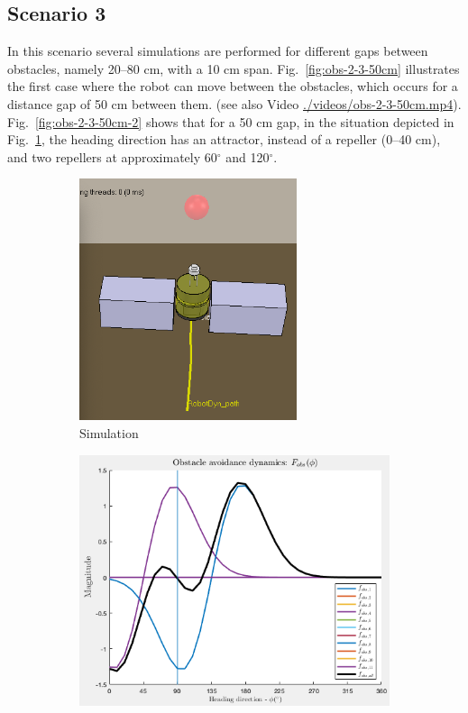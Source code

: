 \subsection{Scenario 3}%
\label{sec:scenario-3-obs}
In this scenario several simulations are performed for different gaps between
obstacles, namely 20--80 cm, with a 10 cm span. Fig.~\ref{fig:obs-2-3-50cm}
illustrates the first case where the robot can move between the obstacles, which
occurs for a distance gap of 50 cm between them.
(see also Video
\href{run:./videos/obs-2-3-50cm.mp4}{./videos/obs-2-3-50cm.mp4}). Fig.~\ref{fig:obs-2-3-50cm-2}
shows that for a 50 cm gap, in the situation depicted in Fig.~\ref{fig:obs-2-3-50cm-1}, the heading direction has an attractor, instead of a
repeller (0--40 cm), and two repellers at approximately 60$^{\circ}$ and 120$^{\circ}$.
%
\begin{figure}[!hbt]
\centering
\begin{subfigure}{.5\textwidth}
  \centering
  \includegraphics[width=0.7\textwidth]{./img/obs-2-3-50cm-1.png}%
  \caption{Simulation}%
\label{fig:obs-2-3-50cm-1}
\end{subfigure}%
\begin{subfigure}{.5\textwidth}
  \centering
  \includegraphics[width=1.0\textwidth]{./img/obs-2-3-50cm-2.png}%

\end{subfigure}
\end{figure}
